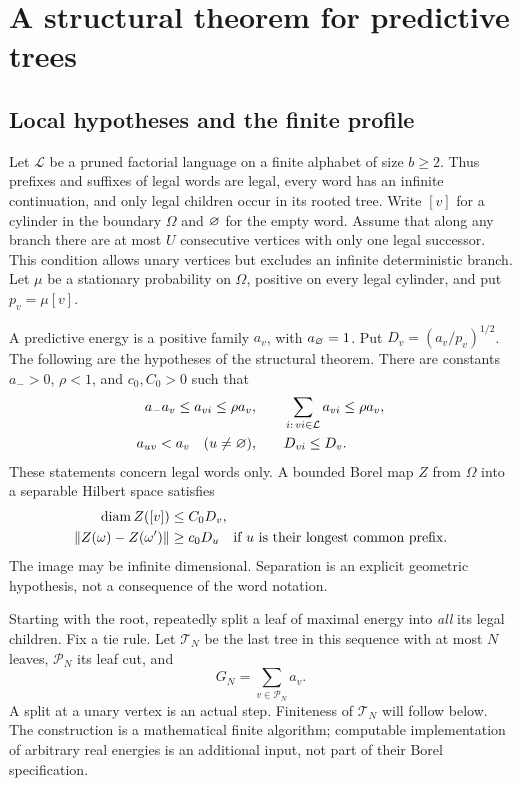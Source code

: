 \section{A structural theorem for predictive trees}\label{sec:v7-trees}
\subsection{Local hypotheses and the finite profile}
Let $\mathcal L$ be a pruned factorial language on a finite alphabet of
size $b\ge2$. Thus prefixes and suffixes of legal words are legal, every
word has an infinite continuation, and only legal children occur in its
rooted tree. Write $[v]$ for a cylinder in the boundary $\Omega$ and
$\varnothing$ for the empty word. Assume that along any branch there are at
most $U$ consecutive vertices with only one legal successor. This
condition allows unary vertices but excludes an infinite deterministic
branch. Let $\mu$ be a stationary probability on $\Omega$, positive on
every legal cylinder, and put $p_v=\mu[v]$.

A predictive energy is a positive family $a_v$, with $a_{\varnothing}=1$.
Put $D_v=(a_v/p_v)^{1/2}$. The following are the hypotheses of the
structural theorem. There are constants $a_->0$, $\rho<1$, and
$c_0,C_0>0$ such that
\begin{align}
 a_-a_v\le a_{vi}\le\rho a_v,
 &\qquad\sum_{i:\,vi\in\mathcal L}a_{vi}\le\rho a_v,
                                                   \label{eq:v7-tree-child}\\
 a_{uv}<a_v\quad(u\ne\varnothing),
 &\qquad D_{vi}\le D_v.                             \label{eq:v7-tree-suffix}
\end{align}
These statements concern legal words only. A bounded Borel map $Z$ from
$\Omega$ into a separable Hilbert space satisfies
\begin{align}
 \operatorname{diam} Z([v])&\le C_0D_v,                            \label{eq:v7-tree-diameter}\\
 \|Z(\omega)-Z(\omega')\|&\ge c_0D_u
 \quad\text{if $u$ is their longest common prefix}.  \label{eq:v7-tree-separation}
\end{align}
The image may be infinite dimensional. Separation is an explicit
geometric hypothesis, not a consequence of the word notation.

Starting with the root, repeatedly split a leaf of maximal energy into
\emph{all} its legal children. Fix a tie rule. Let $\mathcal T_N$ be the
last tree in this sequence with at most $N$ leaves, $\mathcal P_N$ its
leaf cut, and
\begin{equation}
             G_N=\sum_{v\in\mathcal P_N}a_v.         \label{eq:v7-greedy}
\end{equation}
A split at a unary vertex is an actual step. Finiteness of $\mathcal T_N$
will follow below. The construction is a mathematical finite algorithm;
computable implementation of arbitrary real energies is an additional
input, not part of their Borel specification.

